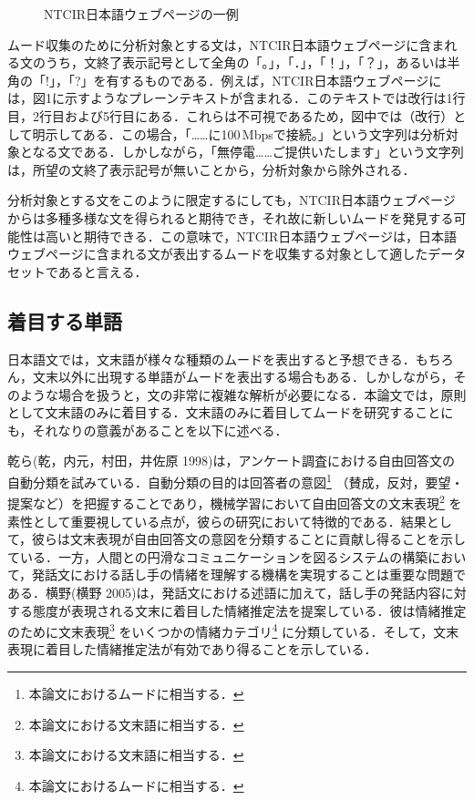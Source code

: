\documentclass[japanese]{jnlp_1.4}
\begin{document}
\begin{figure}[t]

\caption{NTCIR日本語ウェブページの一例}
\end{figure}

ムード収集のために分析対象とする文は，NTCIR日本語ウェブページに含まれる文のうち，文終了表示記号として全角の「。」，「．」，「！」，「？」，あるいは半角の「!」，「?」を有するものである．例えば，NTCIR日本語ウェブページには，図1に示すようなプレーンテキストが含まれる．このテキストでは改行は1行目，2行目および5行目にある．これらは不可視であるため，図中では（改行）として明示してある．この場合，「……に100\,Mbpsで接続。」という文字列は分析対象となる文である．しかしながら，「無停電……ご提供いたします」という文字列は，所望の文終了表示記号が無いことから，分析対象から除外される．

分析対象とする文をこのように限定するにしても，NTCIR日本語ウェブページからは多種多様な文を得られると期待でき，それ故に新しいムードを発見する可能性は高いと期待できる．この意味で，NTCIR日本語ウェブページは，日本語ウェブページに含まれる文が表出するムードを収集する対象として適したデータセットであると言える．

\subsection{着目する単語}

日本語文では，文末語が様々な種類のムードを表出すると予想できる．もちろん，文末以外に出現する単語がムードを表出する場合もある．しかしながら，そのような場合を扱うと，文の非常に複雑な解析が必要になる．本論文では，原則として文末語のみに着目する．文末語のみに着目してムードを研究することにも，それなりの意義があることを以下に述べる．

乾ら(乾，内元，村田，井佐原 1998)は，アンケート調査における自由回答文の自動分類を試みている．自動分類の目的は回答者の意図\footnote{
	本論文におけるムードに相当する．}
（賛成，反対，要望・提案など）を把握することであり，機械学習において自由回答文の文末表現\footnote{
	本論文における文末語に相当する．}
を素性として重要視している点が，彼らの研究において特徴的である．結果として，彼らは文末表現が自由回答文の意図を分類することに貢献し得ることを示している．一方，人間との円滑なコミュニケーションを図るシステムの構築において，発話文における話し手の情緒を理解する機構を実現することは重要な問題である．横野(横野 2005)は，発話文における述語に加えて，話し手の発話内容に対する態度が表現される文末に着目した情緒推定法を提案している．彼は情緒推定のために文末表現\footnote{
	本論文における文末語に相当する．}
をいくつかの情緒カテゴリ\footnote{
	本論文におけるムードに相当する．}
に分類している．そして，文末表現に着目した情緒推定法が有効であり得ることを示している．
\end{document}
